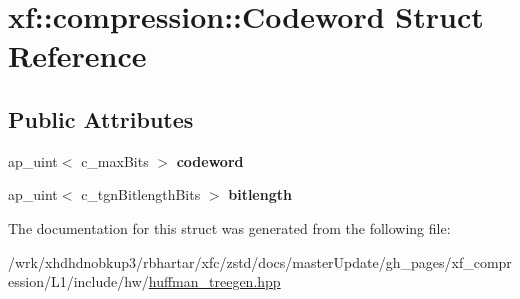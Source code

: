 \hypertarget{structxf_1_1compression_1_1Codeword}{\section{xf\-:\-:compression\-:\-:Codeword Struct Reference}
\label{structxf_1_1compression_1_1Codeword}
}
\subsection*{Public Attributes}
\begin{DoxyCompactItemize}
\item 
\hypertarget{structxf_1_1compression_1_1Codeword_a6045eb37d7c73f8a4ea0e644fc151662}{ap\-\_\-uint$<$ c\-\_\-max\-Bits $>$ {\bfseries codeword}}\label{structxf_1_1compression_1_1Codeword_a6045eb37d7c73f8a4ea0e644fc151662}

\item 
\hypertarget{structxf_1_1compression_1_1Codeword_a1833cbef40b9839df77d45984b6879f1}{ap\-\_\-uint$<$ c\-\_\-tgn\-Bitlength\-Bits $>$ {\bfseries bitlength}}\label{structxf_1_1compression_1_1Codeword_a1833cbef40b9839df77d45984b6879f1}

\end{DoxyCompactItemize}


The documentation for this struct was generated from the following file\-:\begin{DoxyCompactItemize}
\item 
/wrk/xhdhdnobkup3/rbhartar/xfc/zstd/docs/master\-Update/gh\-\_\-pages/xf\-\_\-compression/\-L1/include/hw/\hyperlink{huffman__treegen_8hpp}{huffman\-\_\-treegen.\-hpp}\end{DoxyCompactItemize}
